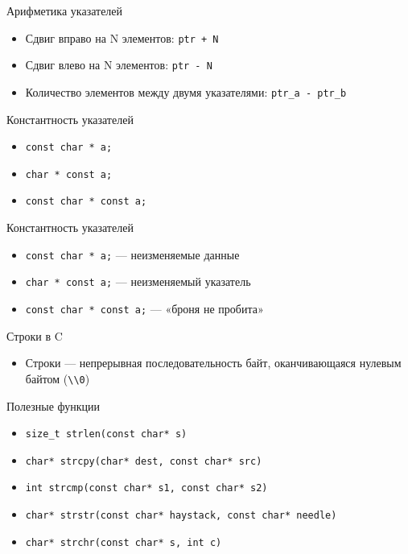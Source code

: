 \documentclass[10pt,pdf,hyperref={unicode}]{beamer}
\begin{document}
\begin{frame}{Арифметика указателей}
    \begin{itemize}
        \item Сдвиг вправо на N элементов: \lstinline{ptr + N}
        \item Сдвиг влево на N элементов: \lstinline{ptr - N}
        \item Количество элементов между двумя указателями: \lstinline{ptr_a - ptr_b}
    \end{itemize}
\end{frame}


\begin{frame}{Константность указателей}
    \begin{itemize}
        \item \lstinline{const char * a;}
        \item \lstinline{char * const a;}
        \item \lstinline{const char * const a;}
    \end{itemize}
\end{frame}


\begin{frame}{Константность указателей}
    \begin{itemize}
        \item \lstinline{const char * a;} — неизменяемые данные
        \item \lstinline{char * const a;} — неизменяемый указатель
        \item \lstinline{const char * const a;} — «броня не пробита»
    \end{itemize}
\end{frame}


\begin{frame}{Строки в C}
    \begin{itemize}
        \item Строки — непрерывная последовательность байт, оканчивающаяся нулевым байтом (\lstinline{\\0})
    \end{itemize}
\end{frame}

\begin{frame}{Полезные функции}
\begin{itemize}
    \item \lstinline{size_t strlen(const char* s)}
    \item \lstinline{char* strcpy(char* dest, const char* src)}
    \item \lstinline{int strcmp(const char* s1, const char* s2)}
    \item \lstinline{char* strstr(const char* haystack, const char* needle)}
    \item \lstinline{char* strchr(const char* s, int c)}
\end{itemize}
\end{frame}
\end{document}
